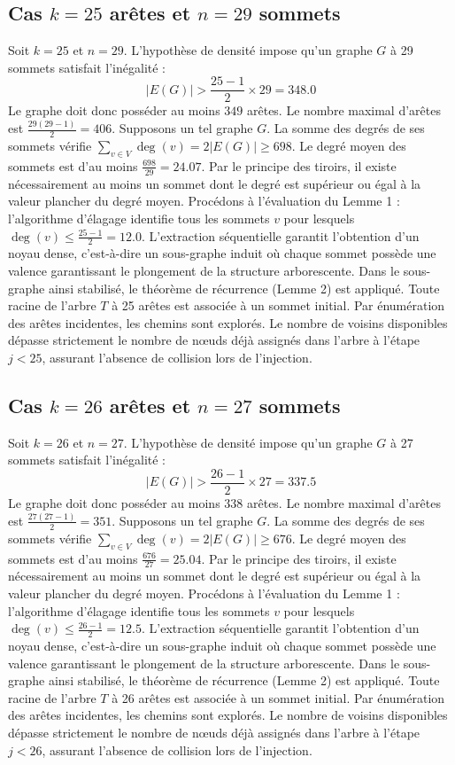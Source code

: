\documentclass[12pt,a4paper]{article}
\begin{document}
\subsection{Cas $k = 25$ arêtes et $n = 29$ sommets}
Soit $k = 25$ et $n = 29$. L'hypothèse de densité impose qu'un graphe $G$ à 29 sommets satisfait l'inégalité :
$$ |E(G)| > \frac{25-1}{2} \times 29 = 348.0 $$
Le graphe doit donc posséder au moins $349$ arêtes. Le nombre maximal d'arêtes est $\frac{29(29-1)}{2} = 406$.
Supposons un tel graphe $G$. La somme des degrés de ses sommets vérifie $\sum_{v \in V} \deg(v) = 2|E(G)| \geq 698$.
Le degré moyen des sommets est d'au moins $\frac{698}{29} = 24.07$.
Par le principe des tiroirs, il existe nécessairement au moins un sommet dont le degré est supérieur ou égal à la valeur plancher du degré moyen.
Procédons à l'évaluation du Lemme 1 : l'algorithme d'élagage identifie tous les sommets $v$ pour lesquels $\deg(v) \leq \frac{25-1}{2} = 12.0$.
L'extraction séquentielle garantit l'obtention d'un noyau dense, c'est-à-dire un sous-graphe induit où chaque sommet possède une valence garantissant le plongement de la structure arborescente.
Dans le sous-graphe ainsi stabilisé, le théorème de récurrence (Lemme 2) est appliqué. Toute racine de l'arbre $T$ à 25 arêtes est associée à un sommet initial. Par énumération des arêtes incidentes, les chemins sont explorés. Le nombre de voisins disponibles dépasse strictement le nombre de nœuds déjà assignés dans l'arbre à l'étape $j < 25$, assurant l'absence de collision lors de l'injection.

\subsection{Cas $k = 26$ arêtes et $n = 27$ sommets}
Soit $k = 26$ et $n = 27$. L'hypothèse de densité impose qu'un graphe $G$ à 27 sommets satisfait l'inégalité :
$$ |E(G)| > \frac{26-1}{2} \times 27 = 337.5 $$
Le graphe doit donc posséder au moins $338$ arêtes. Le nombre maximal d'arêtes est $\frac{27(27-1)}{2} = 351$.
Supposons un tel graphe $G$. La somme des degrés de ses sommets vérifie $\sum_{v \in V} \deg(v) = 2|E(G)| \geq 676$.
Le degré moyen des sommets est d'au moins $\frac{676}{27} = 25.04$.
Par le principe des tiroirs, il existe nécessairement au moins un sommet dont le degré est supérieur ou égal à la valeur plancher du degré moyen.
Procédons à l'évaluation du Lemme 1 : l'algorithme d'élagage identifie tous les sommets $v$ pour lesquels $\deg(v) \leq \frac{26-1}{2} = 12.5$.
L'extraction séquentielle garantit l'obtention d'un noyau dense, c'est-à-dire un sous-graphe induit où chaque sommet possède une valence garantissant le plongement de la structure arborescente.
Dans le sous-graphe ainsi stabilisé, le théorème de récurrence (Lemme 2) est appliqué. Toute racine de l'arbre $T$ à 26 arêtes est associée à un sommet initial. Par énumération des arêtes incidentes, les chemins sont explorés. Le nombre de voisins disponibles dépasse strictement le nombre de nœuds déjà assignés dans l'arbre à l'étape $j < 26$, assurant l'absence de collision lors de l'injection.
\end{document}

